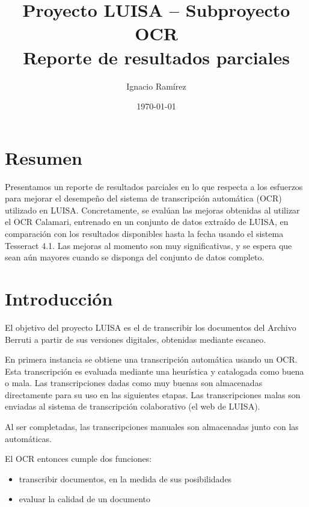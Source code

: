 \documentclass{article}
\author{Ignacio Ramírez}
\title{Proyecto LUISA -- Subproyecto OCR \\ Reporte de resultados parciales}
\date{\today}
\begin{document}

\maketitle

\section{Resumen}
Presentamos un reporte de resultados parciales en lo que respecta a los
esfuerzos para mejorar el desempeño del sistema de transcripción automática
(OCR) utilizado en LUISA. Concretamente, se evalúan las mejoras obtenidas al
utilizar el OCR Calamari, entrenado en un conjunto de datos extraído de LUISA,
en comparación con los resultados disponibles hasta la fecha usando el sistema
Tesseract 4.1. Las mejoras al momento son muy significativas, y se espera
que sean aún mayores cuando se disponga del conjunto de datos completo.


\section{Introducción}

El objetivo del proyecto LUISA es el de transcribir los documentos del Archivo
Berruti a partir de sus versiones digitales, obtenidas mediante escaneo.

En primera instancia se obtiene una transcripción automática usando  un OCR.
Esta transcripción es evaluada mediante una heurística y catalogada como buena
o mala. Las transcripciones dadas como muy buenas son almacenadas directamente
para su uso en las siguientes etapas. Las transcripciones malas son enviadas
al sistema de transcripción colaborativo (el web de LUISA).

Al ser completadas, las transcripciones manuales son almacenadas junto con las
automáticas.

El OCR entonces cumple dos funciones:
\begin{itemize}
\item transcribir documentos, en la medida de sus posibilidades
\item evaluar la calidad de un documento
\end{itemize}
\end{document}
